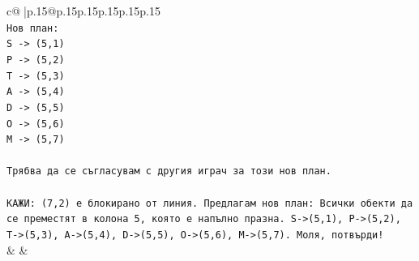 \documentclass{article}
\begin{document}
{\begin{supertabular}{c@{$\;$}|p{.15\linewidth}@{}p{.15\linewidth}p{.15\linewidth}p{.15\linewidth}p{.15\linewidth}p{.15\linewidth}}
{{{\\ 
\texttt{Нов план:} \\
\texttt{S {-}> (5,1)} \\
\texttt{P {-}> (5,2)} \\
\texttt{T {-}> (5,3)} \\
\texttt{A {-}> (5,4)} \\
\texttt{D {-}> (5,5)} \\
\texttt{O {-}> (5,6)} \\
\texttt{M {-}> (5,7)} \\
\\ 
\texttt{Трябва да се съгласувам с другия играч за този нов план.} \\
\\ 
\texttt{КАЖИ: (7,2) е блокирано от линия. Предлагам нов план: Всички обекти да се преместят в колона 5, която е напълно празна. S{-}>(5,1), P{-}>(5,2), T{-}>(5,3), A{-}>(5,4), D{-}>(5,5), O{-}>(5,6), M{-}>(5,7). Моля, потвърди!} \\
            }
        }
    }
    & & \\ \\


\end{supertabular}}
\end{document}
